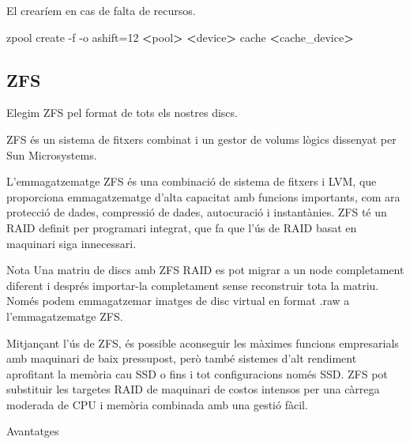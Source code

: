 \documentclass[
  10pt,
]{krantz}
\newenvironment{Shaded}{\begin{snugshade}}{\end{snugshade}}
\newcommand{\AttributeTok}[1]{\textcolor[rgb]{0.77,0.63,0.00}{#1}}
\newcommand{\ExtensionTok}[1]{#1}
\newcommand{\NormalTok}[1]{#1}
\newcommand{\OperatorTok}[1]{\textcolor[rgb]{0.81,0.36,0.00}{\textbf{#1}}}
\begin{document}
El crearíem en cas de falta de recursos.

\begin{Shaded}
\begin{Highlighting}[]
\ExtensionTok{zpool}\NormalTok{ create }\AttributeTok{{-}f} \AttributeTok{{-}o}\NormalTok{ ashift=12 }\OperatorTok{\textless{}}\NormalTok{pool}\OperatorTok{\textgreater{}} \OperatorTok{\textless{}}\NormalTok{device}\OperatorTok{\textgreater{}}\NormalTok{ cache }\OperatorTok{\textless{}}\NormalTok{cache\_device}\OperatorTok{\textgreater{}}
\end{Highlighting}
\end{Shaded}

\hypertarget{zfs}{%
\subsection{ZFS}\label{zfs}}

Elegim ZFS pel format de tots els nostres discs.

ZFS és un sistema de fitxers combinat i un gestor de volums lògics dissenyat per Sun Microsystems.

L'emmagatzematge ZFS és una combinació de sistema de fitxers i LVM, que proporciona emmagatzematge d'alta capacitat amb funcions importants, com ara protecció de dades, compressió de dades, autocuració i instantànies. ZFS té un RAID definit per programari integrat, que fa que l'ús de RAID basat en maquinari siga innecessari.

\begin{rmdnote}{Nota}
Una matriu de discs amb ZFS RAID es pot migrar a un node completament diferent i després importar-la completament sense reconstruir tota la matriu. Només podem emmagatzemar imatges de disc virtual en format .raw a l'emmagatzematge ZFS.

\end{rmdnote}

Mitjançant l'ús de ZFS, és possible aconseguir les màximes funcions empresarials amb maquinari de baix pressupost, però també sistemes d'alt rendiment aprofitant la memòria cau SSD o fins i tot configuracions només SSD. ZFS pot substituir les targetes RAID de maquinari de costos intensos per una càrrega moderada de CPU i memòria combinada amb una gestió fàcil.

Avantatges
\end{document}
